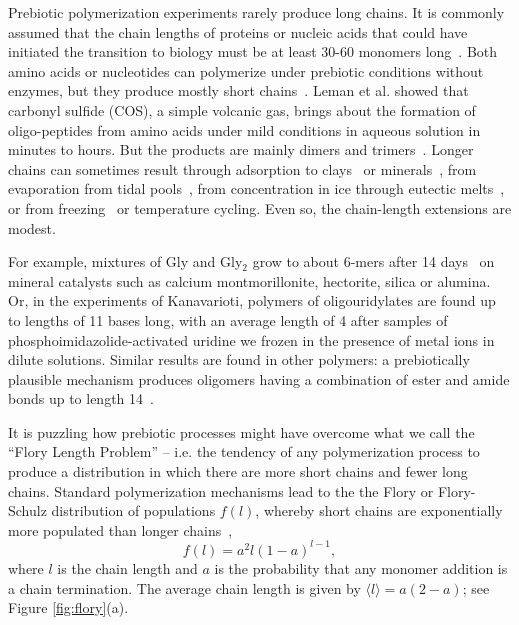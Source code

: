 \documentclass[twocolumn,letterpaper]{revtex4-1}
\begin{document}
Prebiotic polymerization experiments rarely produce long chains.  It is commonly assumed that the 
chain lengths of proteins or nucleic acids that could have initiated the transition to biology must 
be at least 30-60 monomers long~\cite{Szostak1993}.  
Both amino acids or nucleotides can polymerize under prebiotic conditions without enzymes, but 
they 
produce mostly short chains~\cite{Shock1992,Martin1998,PAECHT-HOROWITZ1970,Leman2004a,Orgel2004}.  
Leman et al. showed that carbonyl sulfide (COS), a simple volcanic gas, brings about the formation 
of oligo-peptides from amino acids under mild conditions in aqueous solution in minutes to hours. 
But the products are mainly dimers and trimers~\cite{Leman2004a}.  Longer chains can sometimes 
result through adsorption to clays~\cite{Rao1980,Lambert2008} or 
minerals~\cite{Bernal1949,Ferris1996}, from evaporation from tidal pools~\cite{Nelson2001}, from 
concentration in ice through eutectic melts~\cite{Kanavarioti2001}, or from 
freezing~\cite{Bada2004} or temperature cycling.  Even so, the chain-length extensions are modest. 
 
For example, mixtures of Gly and Gly$_2$ grow to about 6-mers after 14 
days~\cite{Rode1997,Rode1999} on mineral catalysts such as calcium montmorillonite, hectorite, 
silica or alumina.  Or, in the 
experiments of Kanavarioti, polymers of oligouridylates are found up to lengths of 11 bases long, 
with an average length of 4 \cite{Kanavarioti2001} after samples of phosphoimidazolide-activated 
uridine we frozen in the presence of metal ions in dilute solutions.  Similar results are found in 
other polymers: a prebiotically plausible mechanism produces oligomers having a combination of 
ester and amide bonds up to length 14~\cite{Forsythe2015}.  

It is puzzling how prebiotic processes might have overcome what we call the ``Flory Length 
Problem'' -- i.e. the tendency of any 
polymerization process to produce a distribution in which there are more short chains and fewer 
long chains.  Standard polymerization mechanisms lead to the the Flory or Flory-Schulz distribution 
of populations $f(l)$, whereby short chains are exponentially more populated than longer 
chains~\cite{Flory1953}, 
\begin{equation}
 f(l)=a^2l(1-a)^{l-1},\label{eq:flory}
\end{equation} 
where $l$ is the chain length and $a$ is the probability that any monomer addition is a chain 
termination.  The average chain length is given by $\langle l \rangle = a(2- a)$; see Figure 
\ref{fig:flory}(a).  
\end{document}
